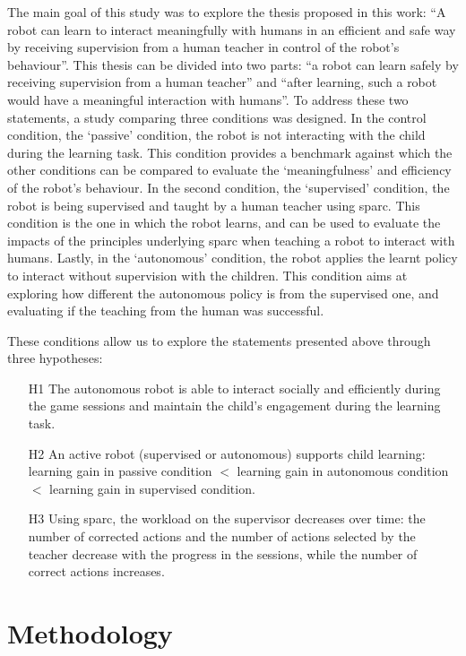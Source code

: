 The main goal of this study was to explore the thesis proposed in this work: ``A robot can learn to interact meaningfully with humans in an efficient and safe way by receiving supervision from a human teacher in control of the robot's behaviour''. This thesis can be divided into two parts: ``a robot can learn safely by receiving supervision from a human teacher'' and ``after learning, such a robot would have a meaningful interaction with humans''. To address these two statements, a study comparing three conditions was designed. In the control condition, the `passive' condition, the robot is not interacting with the child during the learning task. This condition provides a benchmark against which the other conditions can be compared to evaluate the `meaningfulness' and efficiency of the robot's behaviour. In the second condition, the `supervised' condition, the robot is being supervised and taught by a human teacher using \gls{sparc}. This condition is the one in which the robot learns, and can be used to evaluate the impacts of the principles underlying \gls{sparc} when teaching a robot to interact with humans. Lastly, in the `autonomous' condition, the robot applies the learnt policy to interact without supervision with the children. This condition aims at exploring how different the autonomous policy is from the supervised one, and evaluating if the teaching from the human was successful.

These conditions allow us to explore the statements presented above through three hypotheses:
\begin{itemize}
	\item [H1] The autonomous robot is able to interact socially and efficiently during the game sessions and maintain the child's engagement during the learning task.
	\item [H2] An active robot (supervised or autonomous) supports child learning: learning gain in passive condition $<$ learning gain in autonomous condition $<$ learning gain in supervised condition.
	\item [H3] Using \gls{sparc}, the workload on the supervisor decreases over time: the number of corrected actions and the number of actions selected  by the teacher decrease with the progress in the sessions, while the number of correct actions increases.
\end{itemize}

\section{Methodology}

